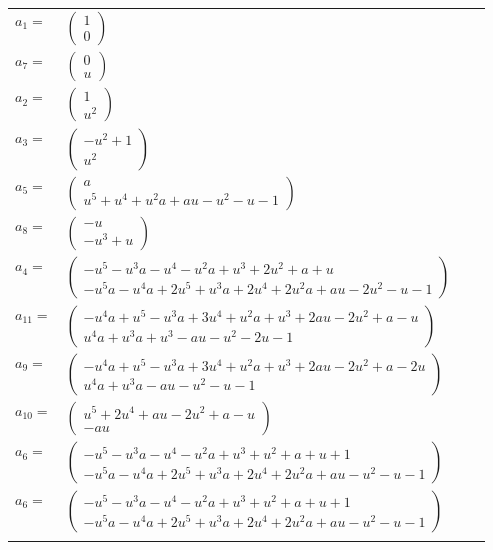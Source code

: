 \documentclass[1p]{elsarticle_modified}
\theoremstyle{definition}
\begin{document}
\begin{tabular}{m{7pt} m{180pt} m{7pt} m{180pt} }
\flushright $a_{1}=$&$\begin{pmatrix}1\\0\end{pmatrix}$ \\
\flushright $a_{7}=$&$\begin{pmatrix}0\\u\end{pmatrix}$ \\
\flushright $a_{2}=$&$\begin{pmatrix}1\\u^2\end{pmatrix}$ \\
\flushright $a_{3}=$&$\begin{pmatrix}- u^2+1\\u^2\end{pmatrix}$ \\
\flushright $a_{5}=$&$\begin{pmatrix}a\\u^5+u^4+u^2 a+a u- u^2- u-1\end{pmatrix}$ \\
\flushright $a_{8}=$&$\begin{pmatrix}- u\\- u^3+u\end{pmatrix}$ \\
\flushright $a_{4}=$&$\begin{pmatrix}- u^5- u^3 a- u^4- u^2 a+u^3+2 u^2+a+u\\- u^5 a- u^4 a+2 u^5+u^3 a+2 u^4+2 u^2 a+a u-2 u^2- u-1\end{pmatrix}$ \\
\flushright $a_{11}=$&$\begin{pmatrix}- u^4 a+u^5- u^3 a+3 u^4+u^2 a+u^3+2 a u-2 u^2+a- u\\u^4 a+u^3 a+u^3- a u- u^2-2 u-1\end{pmatrix}$ \\
\flushright $a_{9}=$&$\begin{pmatrix}- u^4 a+u^5- u^3 a+3 u^4+u^2 a+u^3+2 a u-2 u^2+a-2 u\\u^4 a+u^3 a- a u- u^2- u-1\end{pmatrix}$ \\
\flushright $a_{10}=$&$\begin{pmatrix}u^5+2 u^4+a u-2 u^2+a- u\\- a u\end{pmatrix}$ \\
\flushright $a_{6}=$&$\begin{pmatrix}- u^5- u^3 a- u^4- u^2 a+u^3+u^2+a+u+1\\- u^5 a- u^4 a+2 u^5+u^3 a+2 u^4+2 u^2 a+a u- u^2- u-1\end{pmatrix}$\\ \flushright $a_{6}=$&$\begin{pmatrix}- u^5- u^3 a- u^4- u^2 a+u^3+u^2+a+u+1\\- u^5 a- u^4 a+2 u^5+u^3 a+2 u^4+2 u^2 a+a u- u^2- u-1\end{pmatrix}$\\&\end{tabular}
\end{document}
